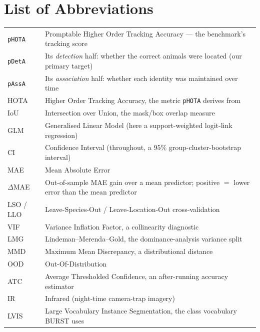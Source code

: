 \documentclass[11pt,a4paper]{report}
\begin{document}
\chapter*{List of Abbreviations}
\begin{tabular}{@{}p{2.7cm}p{12.2cm}@{}}
\texttt{pHOTA}   & Promptable Higher Order Tracking Accuracy --- the benchmark's tracking score \\
\texttt{pDetA}   & Its \emph{detection} half: whether the correct animals were located (our primary target) \\
\texttt{pAssA}   & Its \emph{association} half: whether each identity was maintained over time \\
HOTA             & Higher Order Tracking Accuracy, the metric \texttt{pHOTA} derives from \\
IoU              & Intersection over Union, the mask/box overlap measure \\
\addlinespace
GLM              & Generalised Linear Model (here a support-weighted logit-link regression) \\
CI               & Confidence Interval (throughout, a $95\%$ group-cluster-bootstrap interval) \\
MAE              & Mean Absolute Error \\
$\Delta$MAE      & Out-of-sample MAE gain over a mean predictor; positive $=$ lower error than the mean predictor \\
LSO / LLO        & Leave-Species-Out / Leave-Location-Out cross-validation \\
VIF              & Variance Inflation Factor, a collinearity diagnostic \\
LMG              & Lindeman--Merenda--Gold, the dominance-analysis variance split \\
MMD              & Maximum Mean Discrepancy, a distributional distance \\
\addlinespace
OOD              & Out-Of-Distribution \\
ATC              & Average Thresholded Confidence, an after-running accuracy estimator \\
IR               & Infrared (night-time camera-trap imagery) \\
LVIS             & Large Vocabulary Instance Segmentation, the class vocabulary BURST uses \\
\end{tabular}

\clearpage
{}








\clearpage
{}



\appendix

\end{document}
